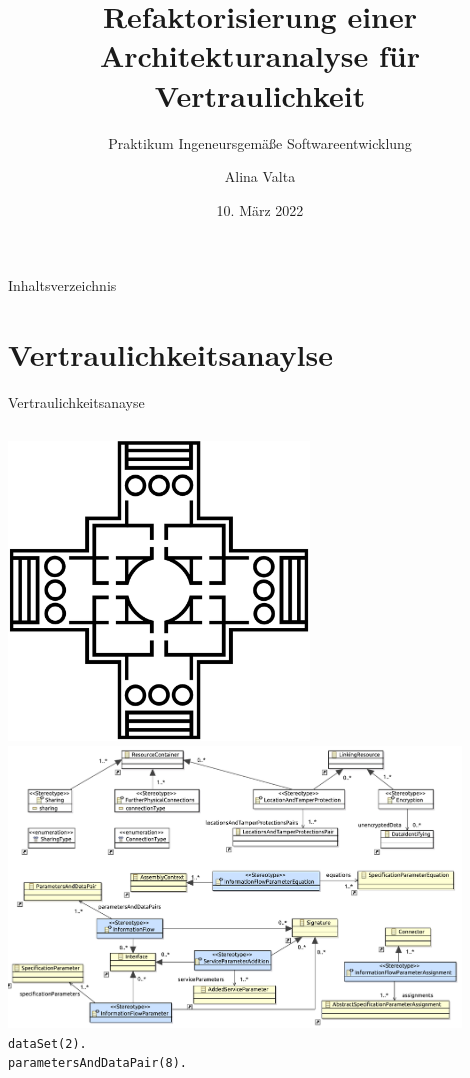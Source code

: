 \documentclass{sdqbeamer}
\title[Refaktorisierung einer Architekturanalyse für Vertraulichkeit]{Refaktorisierung einer Architekturanalyse für Vertraulichkeit}
\subtitle{Praktikum Ingeneursgemäße Softwareentwicklung}
\author[Alina Valta]{Alina Valta}
\date[10.\,03.\,2022]{10. März 2022}
\begin{document}
\KITtitleframe

\begin{frame}{Inhaltsverzeichnis}
\tableofcontents
\end{frame}

\section{Vertraulichkeitsanaylse}
\begin{frame}{Vertraulichkeitsanayse}
\begin{columns}[c]
	\centering
	\includegraphics[width=0.6\textwidth]{images/Palladio-logo.png}
	\vspace{0.05\textheight}
	\centering
	\includegraphics[width=0.9\textwidth]{images/confidentiality_profile.pdf}
	\vspace{0.05\textheight}
	\texttt{\footnotesize dataSet(2).\\
		parametersAndDataPair(8).\\
}
\end{columns}
\end{frame}
\end{document}
